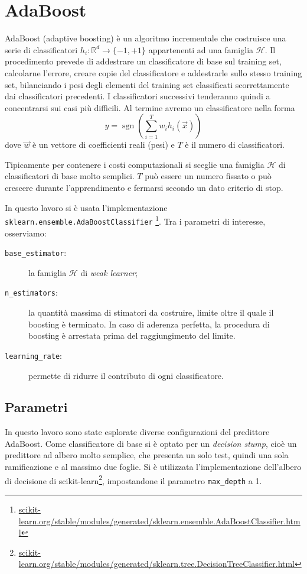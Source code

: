 \documentclass[12pt,a4paper,oneside,hidelinks]{report}
\DeclareMathOperator*{\sgn}{sgn}
\begin{document}
\section{AdaBoost}
AdaBoost (adaptive boosting) è un algoritmo incrementale che costruisce una serie di classificatori $ h_{i}:\mathbb{R}^{d}\rightarrow \{-1,+1\} $ appartenenti ad una famiglia $ \mathcal{H} $. 
Il procedimento prevede di addestrare un classificatore di base sul training set, calcolarne l'errore, creare copie del classificatore e addestrarle sullo stesso training set, bilanciando i pesi degli elementi del training set classificati scorrettamente dai classificatori precedenti. I classificatori successivi tenderanno quindi a concentrarsi sui casi più difficili.
Al termine avremo un classificatore nella forma
\[\hat{y}=\sgn(\sum_{i=1}^{T} w_{i}h_{i}(\vec{x}))\]
dove $ \vec{w} $ è un vettore di coefficienti reali (pesi) e $ T $ è il numero di classificatori.

Tipicamente per contenere i costi computazionali si sceglie una famiglia $ \mathcal{H} $ di classificatori di base molto semplici. $ T $ può essere un numero fissato o può crescere durante l'apprendimento e fermarsi secondo un dato criterio di stop.

In questo lavoro si è usata l'implementazione \texttt{sklearn.ensemble.AdaBoostClassifier}
\footnote{\url{scikit-learn.org/stable/modules/generated/sklearn.ensemble.AdaBoostClassifier.html}}.
Tra i parametri di interesse, osserviamo:

\begin{description}
\item[\texttt{base\_estimator}:]la famiglia $ \mathcal{H} $ di \emph{weak learner};
\item[\texttt{n\_estimators}:]la quantità massima di stimatori da costruire, limite oltre il quale il boosting è terminato.
In caso di aderenza perfetta, la procedura di boosting è arrestata prima del raggiungimento del limite.
\item[\texttt{learning\_rate}:] permette di ridurre il contributo di ogni classificatore.

\end{description}
 
\subsection{Parametri}
In questo lavoro sono state esplorate diverse configurazioni del predittore AdaBoost.
Come classificatore di base si è optato per un \emph{decision stump}, cioè un predittore ad albero molto semplice, che presenta un solo test, quindi una sola ramificazione e al massimo due foglie. Si è utilizzata l'implementazione dell'albero di decisione di scikit-learn\footnote{\url{scikit-learn.org/stable/modules/generated/sklearn.tree.DecisionTreeClassifier.html}}, impostandone il parametro \texttt{max\_depth} a 1.
\end{document}
